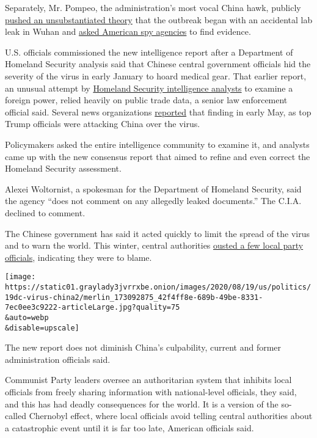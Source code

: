 Separately, Mr. Pompeo, the administration's most vocal China hawk,
publicly
\href{https://www.nytimes3xbfgragh.onion/2020/05/03/us/politics/coronavirus-pompeo-wuhan-china-lab.html}{pushed
an unsubstantiated theory} that the outbreak began with an accidental
lab leak in Wuhan and
\href{https://www.nytimes3xbfgragh.onion/2020/04/30/us/politics/trump-administration-intelligence-coronavirus-china.html}{asked
American spy agencies} to find evidence.

U.S. officials commissioned the new intelligence report after a
Department of Homeland Security analysis said that Chinese central
government officials hid the severity of the virus in early January to
hoard medical gear. That earlier report, an unusual attempt by
\href{https://www.nytimes3xbfgragh.onion/2020/08/01/us/politics/brian-murphy-homeland-security-protesters.html}{Homeland
Security intelligence analysts} to examine a foreign power, relied
heavily on public trade data, a senior law enforcement official said.
Several news organizations
\href{https://apnews.com/bf685dcf52125be54e030834ab7062a8}{reported}
that finding in early May, as top Trump officials were attacking China
over the virus.

Policymakers asked the entire intelligence community to examine it, and
analysts came up with the new consensus report that aimed to refine and
even correct the Homeland Security assessment.

Alexei Woltornist, a spokesman for the Department of Homeland Security,
said the agency ``does not comment on any allegedly leaked documents.''
The C.I.A. declined to comment.

The Chinese government has said it acted quickly to limit the spread of
the virus and to warn the world. This winter, central authorities
\href{https://www.nytimes3xbfgragh.onion/2020/02/13/world/asia/china-coronavirus-xi-jinping.html}{ousted
a few local party officials}, indicating they were to blame.

\texttt{[image: https://static01.graylady3jvrrxbe.onion/images/2020/08/19/us/politics/19dc-virus-china2/merlin\_173092875\_42f4ff8e-689b-49be-8331-7ec0ee3c9222-articleLarge.jpg?quality=75\\\&auto=webp\\\&disable=upscale]}

The new report does not diminish China's culpability, current and former
administration officials said.

Communist Party leaders oversee an authoritarian system that inhibits
local officials from freely sharing information with national-level
officials, they said, and this has had deadly consequences for the
world. It is a version of the so-called Chernobyl effect, where local
officials avoid telling central authorities about a catastrophic event
until it is far too late, American officials said.

